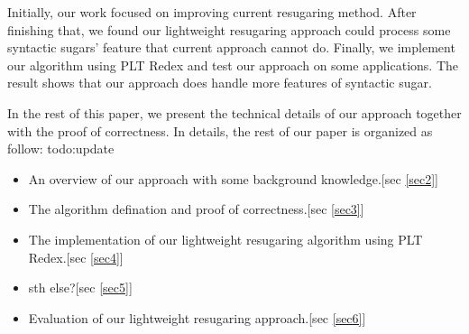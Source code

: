 Initially, our work focused on improving current resugaring method. After finishing that, we found our lightweight resugaring approach could process some syntactic sugars' feature that current approach cannot do. Finally, we implement our algorithm using PLT Redex\cite{SEwPR} and test our approach on some applications. The result shows that our approach does handle more features of syntactic sugar.

In the rest of this paper, we present the technical details of our approach together with the proof of correctness. In details, the rest of our paper is organized as follow: todo:update

\begin{itemize}
\item An overview of our approach with some background knowledge.[sec \ref{sec2}]
\item The algorithm defination and proof of correctness.[sec \ref{sec3}]
\item The implementation of our lightweight resugaring algorithm using PLT Redex.[sec \ref{sec4}]
\item sth else?[sec \ref{sec5}]
\item Evaluation of our lightweight resugaring approach.[sec \ref{sec6}]
\end{itemize}

